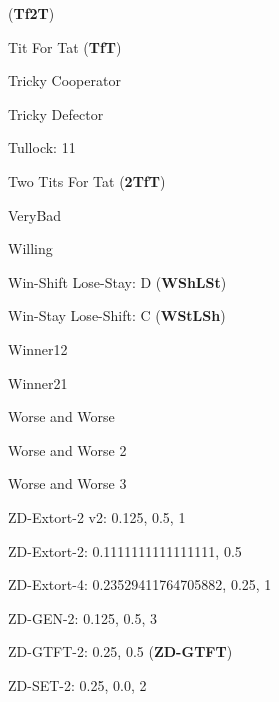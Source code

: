(\textbf{Tf2T})\item Tit For Tat
(\textbf{TfT})\item Tricky Cooperator
\item Tricky Defector
\item Tullock: 11
\item Two Tits For Tat
(\textbf{2TfT})\item VeryBad
\item Willing
\item Win-Shift Lose-Stay: D
(\textbf{WShLSt})\item Win-Stay Lose-Shift: C
(\textbf{WStLSh})\item Winner12
\item Winner21
\item Worse and Worse
\item Worse and Worse 2
\item Worse and Worse 3
\item ZD-Extort-2 v2: 0.125, 0.5, 1
\item ZD-Extort-2: 0.1111111111111111, 0.5
\item ZD-Extort-4: 0.23529411764705882, 0.25, 1
\item ZD-GEN-2: 0.125, 0.5, 3
\item ZD-GTFT-2: 0.25, 0.5
(\textbf{ZD-GTFT})\item ZD-SET-2: 0.25, 0.0, 2
